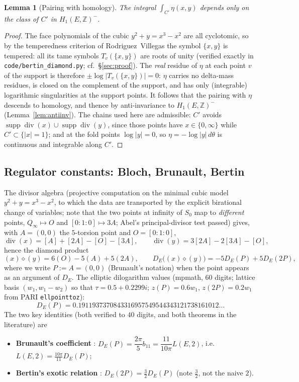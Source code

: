 \documentclass[11pt]{amsart}
\newtheorem{lemma}[theorem]{Lemma}
\theoremstyle{definition}
\theoremstyle{remark}
\newcommand{\Z}{\mathbb{Z}}
\DeclareMathOperator{\divisor}{div}
\begin{document}
\begin{lemma}[Pairing with homology]\label{lem:homology}
The integral $\int_{C'}\eta(x,y)$ depends only on the class of $C'$ in
$H_1(E,\Z)^-$.
\end{lemma}

\begin{proof}
The face polynomials of the cubic $y^2+y=x^3-x^2$ are all cyclotomic, so
by the temperedness criterion of Rodriguez~Villegas \cite{RV} the symbol
$\{x,y\}$ is tempered: all its tame symbols $T_v(\{x,y\})$ are roots of
unity (verified exactly in \texttt{code/bertin\_diamond.py}; cf.\
\S\ref{sec:proof}).  The \emph{real} residue of $\eta$ at each point $v$
of the support is therefore $\pm\log|T_v(\{x,y\})|=0$: $\eta$ carries no
delta-mass residues, is closed on the complement of the support, and has
only (integrable) logarithmic singularities at the support points.  It
follows that the pairing with $\eta$ descends to homology, and thence by
anti-invariance to $H_1(E,\Z)^-$ (Lemma~\ref{lem:antiinv}).  The chains
used here are admissible: $C'$ avoids
$\operatorname{supp}\divisor(x)\cup\operatorname{supp}\divisor(y)$, since
those points have $x\in\{0,\infty\}$ while $C'\subset\{|x|=1\}$; and at
the fold points $\log|y|=0$, so $\eta=-\log|y|\,d\theta$ is continuous
and integrable along $C'$.
\end{proof}

\subsection{Regulator constants: Bloch, Brunault, Bertin}
\label{subsec:anchor}

The divisor algebra (projective computation on the minimal cubic model
$y^2+y=x^3-x^2$, to which the data are transported by the explicit birational
change of variables; note that the two points at infinity of $S_0$ map to
\emph{different} points, $Q_\infty\mapsto O$ and $[0:1:0]\mapsto 3A$; Abel's
principal-divisor test passed) gives, with
$A=(0,0)$ the $5$-torsion point and $O=[0:1:0]$,
\[
  \divisor(x)=[A]+[2A]-[O]-[3A],\qquad
  \divisor(y)=3[2A]-2[3A]-[O],
\]
hence the diamond product
\[
  (x)\diamond(y)=6(O)-5(A)+5(2A),\qquad
  D_E\big((x)\diamond(y)\big)=-5D_E(P)+5D_E(2P),
\]
where we write $P:=A=(0,0)$ (Brunault's notation) when the point appears as
an argument of $D_E$.
The elliptic dilogarithm values (mpmath, $60$ digits; lattice basis
$(w_1,w_1-w_2)$ so that $\tau=0.5+0.2299i$; $z(P)=0.6w_1$, $z(2P)=0.2w_1$
from PARI \texttt{ellpointtoz}):
\[
  D_E(P)=0.1911937370843316957549544343121738161012\ldots
\]
The two key identities (both verified to $40$ digits, and both theorems in
the literature) are
\begin{itemize}
  \item \textbf{Brunault's coefficient} \cite[(3.151)]{Brunault}:
  $D_E(P)=\dfrac{2\pi}{5}b_{11}=\dfrac{11}{10\pi}L(E,2)$, i.e.\
  $L(E,2)=\frac{10\pi}{11}D_E(P)$;
  \item \textbf{Bertin's exotic relation} \cite{Bertin,BertinCrelle,Touafek}:
  $D_E(2P)=\frac32D_E(P)$ (note $\tfrac32$, not the naive $2$).
\end{itemize}
\end{document}
